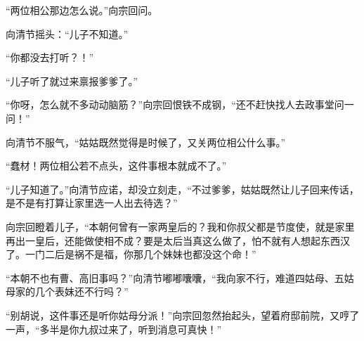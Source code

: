 “两位相公那边怎么说。”向宗回问。

向清节摇头：“儿子不知道。”

“你都没去打听？！”

“儿子听了就过来禀报爹爹了。”

“你呀，怎么就不多动动脑筋？”向宗回恨铁不成钢，“还不赶快找人去政事堂问一问！”

向清节不服气，“姑姑既然觉得是时候了，又关两位相公什么事。”

“蠢材！两位相公若不点头，这件事根本就成不了。”

“儿子知道了。”向清节应诺，却没立刻走，“不过爹爹，姑姑既然让儿子回来传话，是不是有打算让家里选一人出去待选？”

向宗回瞪着儿子，“本朝何曾有一家两皇后的？我和你叔父都是节度使，就是家里再出一皇后，还能做使相不成？要是太后当真这么做了，怕不就有人想起东西汉了。一门二后是祸不是福，你那几个妹妹也都没这个命！”

“本朝不也有曹、高旧事吗？”向清节嘟嘟囔囔，“我向家不行，难道四姑母、五姑母家的几个表妹还不行吗？”

“别胡说，这件事还是听你姑母分派！”向宗回忽然抬起头，望着府邸前院，又哼了一声，“多半是你九叔过来了，听到消息可真快！”
